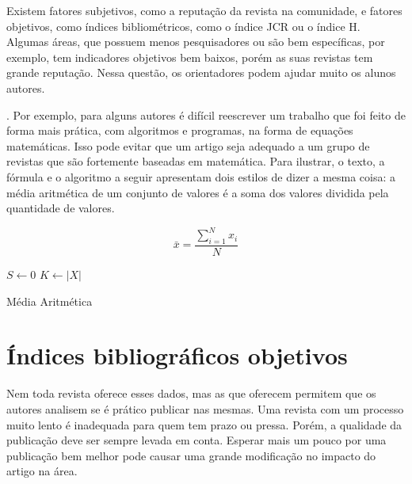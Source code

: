 \documentclass[openany]{book}
\begin{document}
 Existem fatores subjetivos, como a reputação da revista na comunidade, e fatores objetivos, como índices bibliométricos, como o índice JCR ou o índice H. Algumas áreas, que possuem menos pesquisadores ou são bem específicas, por exemplo, tem indicadores objetivos bem baixos, porém as suas revistas tem grande reputação. Nessa questão, os orientadores podem ajudar muito os alunos autores.

. Por exemplo, para alguns autores é difícil reescrever um trabalho que foi feito de forma mais prática, com algoritmos e programas, na forma de equações matemáticas. Isso pode evitar que um artigo seja adequado a um grupo de revistas que são fortemente baseadas em matemática. Para ilustrar, o texto, a fórmula e o algoritmo a seguir apresentam dois estilos de dizer  a mesma coisa: a média aritmética de um conjunto de valores é a soma dos valores dividida pela quantidade de valores.

\begin{equation}
    \bar{x} = \frac{\sum\limits_{i=1}^{N}x_i}{N}
\end{equation}

\begin{algorithm}
    $S \leftarrow 0$ \;
    $K \leftarrow |X|$ \;
    \caption{Média Aritmética}
\end{algorithm}

\section{Índices bibliográficos objetivos}


 Nem toda revista oferece esses dados, mas as que oferecem permitem que os autores analisem se é prático publicar nas mesmas. Uma revista com um processo muito lento é inadequada para quem tem prazo ou pressa. Porém, a qualidade da publicação deve ser sempre levada em conta. Esperar mais um pouco por uma publicação bem melhor pode causar uma grande modificação no impacto do artigo na área.
\end{document}
